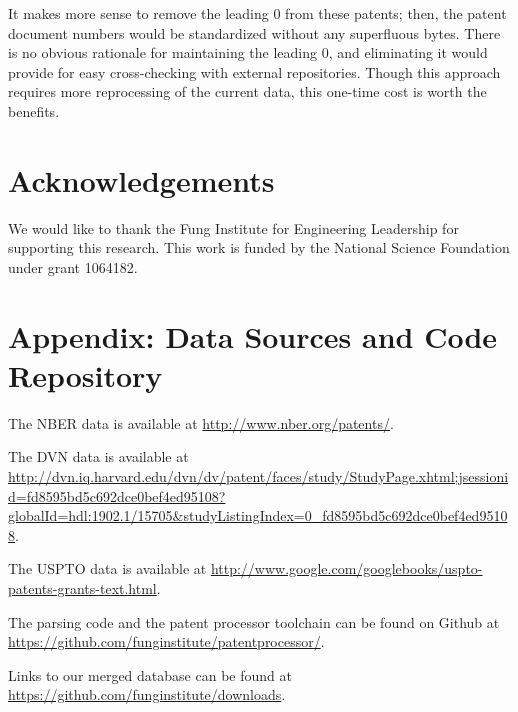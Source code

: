 \documentclass[11pt]{article}
\begin{document}
It makes more sense to remove the leading 0 from these patents; then, the
patent document numbers would be standardized without any superfluous bytes.
There is no obvious rationale for maintaining the leading 0, and eliminating it
would provide for easy cross-checking with external repositories. Though this
approach requires more reprocessing of the current data, this one-time cost is
worth the benefits.

\section{Acknowledgements}

We would like to thank the Fung Institute for Engineering Leadership for
supporting this research. This work is funded by the National Science
Foundation under grant 1064182.

{
\scriptsize


}

\section*{Appendix: Data Sources and Code Repository}

\noindent The NBER data is available at \url{http://www.nber.org/patents/}.

\noindent The DVN data is available at \url{http://dvn.iq.harvard.edu/dvn/dv/patent/faces/study/StudyPage.xhtml;jsessionid=fd8595bd5c692dce0bef4ed95108?globalId=hdl:1902.1/15705&studyListingIndex=0_fd8595bd5c692dce0bef4ed95108}.

\noindent The USPTO data is available at \url{http://www.google.com/googlebooks/uspto-patents-grants-text.html}.

\noindent The parsing code and the patent processor toolchain can be found on Github at \url{https://github.com/funginstitute/patentprocessor/}.

\noindent Links to our merged database can be found at \url{https://github.com/funginstitute/downloads}.
\end{document}
